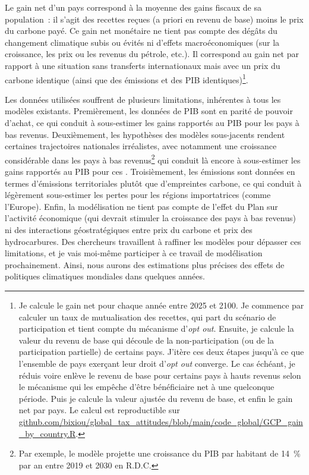 \documentclass[a5paper,french,openany]{memoir}
\begin{document}
Le gain net d'un pays correspond à la moyenne des gains fiscaux de sa population~: il s'agit des recettes reçues (a priori en revenu de base) moins le prix du carbone payé. Ce gain net monétaire ne tient pas compte des dégâts du changement climatique subis ou évités ni d'effets macroéconomiques (sur la croissance, les prix ou les revenus du pétrole, etc.). Il correspond au gain net par rapport à une situation sans transferts internationaux mais avec un prix du carbone identique (ainsi que des émissions et des PIB identiques)\footnote{Je calcule le gain net pour chaque année entre 2025 et 2100. 
Je commence par calculer un taux de mutualisation des recettes, qui part du scénario de participation et tient compte du mécanisme d'\textit{opt out}. Ensuite, je calcule la valeur du revenu de base qui découle de la non-participation (ou de la participation partielle) de certains pays. J'itère ces deux étapes jusqu'à ce que l'ensemble de pays exerçant leur droit d'\textit{opt out} converge. 
Le cas échéant, je réduis voire enlève le revenu de base pour certains pays à hauts revenus selon le mécanisme qui les empêche d'être bénéficiaire net à une quelconque période. Puis je calcule la valeur ajustée du revenu de base, et enfin le gain net par pays. Le calcul est reproductible sur \href{https://github.com/bixiou/global_tax_attitudes/blob/main/code_global/GCP_gain_by_country.R}{github.com/bixiou/global\_tax\_attitudes/blob/main/code\_global/GCP\_gain\_by\_country.R}.}. 

Les données utilisées souffrent de plusieurs limitations, inhérentes à tous les modèles existants. Premièrement, les données de PIB sont en parité de pouvoir d'achat, ce qui conduit à sous-estimer les gains rapportés au PIB pour les pays à bas revenus. Deuxièmement, les hypothèses des modèles sous-jacents rendent certaines trajectoires nationales irréalistes, avec notamment une croissance considérable dans les pays à bas revenus\footnote{Par exemple, le modèle projette une croissance du PIB par habitant de 14~\% par an entre 2019 et 2030 en R.D.C.} qui conduit là encore à sous-estimer les gains rapportés au PIB pour ces . Troisièmement, les émissions sont données en termes d'émissions territoriales plutôt que d'empreintes carbone, ce qui conduit à légèrement %
sous-estimer les pertes pour les régions importatrices (comme l'Europe). Enfin, la modélisation ne tient pas compte de l'effet du Plan sur l'activité économique (qui devrait stimuler la croissance des pays à bas revenus) ni des interactions géostratégiques entre prix du carbone et prix des hydrocarbures. Des chercheurs travaillent à raffiner les modèles pour dépasser ces limitations, et je vais moi-même participer à ce travail de modélisation prochainement. Ainsi, nous aurons des estimations plus précises des effets de politiques climatiques mondiales dans quelques années. %
\end{document}
